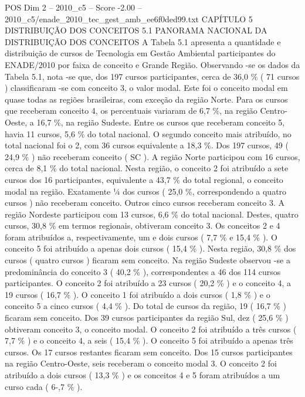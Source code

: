 \begin{textsample}{POS Dim 2 – 2010\_c5 – Score -2.00 – 2010\_c5/enade\_2010\_tec\_gest\_amb\_ee6f0ded99.txt}  \label{ex:f2_pos_333}
CAPÍTULO 5 DISTRIBUIÇÃO DOS CONCEITOS 5.1 PANORAMA NACIONAL DA DISTRIBUIÇÃO DOS CONCEITOS A Tabela 5.1 apresenta a quantidade e distribuição de cursos de Tecnologia em Gestão Ambiental participantes do ENADE/2010 por faixa de conceito e Grande Região.
Observando -se os dados da Tabela 5.1, nota -se que, dos 197 cursos participantes, cerca de 36,0 \% ( 71 cursos ) classificaram -se com conceito 3, o valor modal.
Este foi o conceito modal em quase todas as regiões brasileiras, com exceção da região Norte.
Para os cursos que receberam conceito 4, os percentuais variaram de 6,7 \%, na região Centro-Oeste, a 16,7 \%, na região Sudeste.
Entre os cursos que receberam conceito 5, havia 11 cursos, 5,6 \% do total nacional.
O segundo conceito mais atribuído, no total nacional foi o 2, com 36 cursos equivalente a 18,3 \%.
Dos 197 cursos, 49 ( 24,9 \% ) não receberam conceito ( SC ).
A região Norte participou com 16 cursos, cerca de 8,1 \% do total nacional.
Nesta região, o conceito 2 foi atribuído a sete cursos dos 16 participantes, equivalente a 43,7 \% do total regional, o conceito modal na região.
Exatamente ¼ dos cursos ( 25,0 \%, correspondendo a quatro cursos ) não receberam conceito.
Outros cinco cursos receberam conceito 3.
A região Nordeste participou com 13 cursos, 6,6 \% do total nacional.
Destes, quatro cursos, 30,8 \% em termos regionais, obtiveram conceito 3.
Os conceitos 2 e 4 foram atribuídos a, respectivamente, um e dois cursos ( 7,7 \% e 15,4 \% ).
O conceito 5 foi atribuído a apenas dois cursos ( 15,4 \% ).
Nesta região, 30,8 \% dos cursos ( quatro cursos ) ficaram sem conceito.
Na região Sudeste observou -se a predominância do conceito 3 ( 40,2 \% ), correspondentes a 46 dos 114 cursos participantes.
O conceito 2 foi atribuído a 23 cursos ( 20,2 \% ) e o conceito 4, a 19 cursos ( 16,7 \% ).
O conceito 1 foi atribuído a dois cursos ( 1,8 \% ) e o conceito 5 a cinco cursos ( 4,4 \% ).
Do total de cursos da região, 19 ( 16,7 \% ) ficaram sem conceito.
Dos 39 cursos participantes da região Sul, dez ( 25,6 \% ) obtiveram conceito 3, o conceito modal.
O conceito 2 foi atribuído a três cursos ( 7,7 \% ) e o conceito 4, a seis ( 15,4 \% ).
O conceito 5 foi atribuído a apenas três cursos.
Os 17 cursos restantes ficaram sem conceito.
Dos 15 cursos participantes na região Centro-Oeste, seis receberam o conceito modal 3.
O conceito 2 foi atribuído a dois cursos ( 13,3 \% ) e os conceitos 4 e 5 foram atribuídos a um curso cada ( 6-,7 \% ).

\end{textsample}

